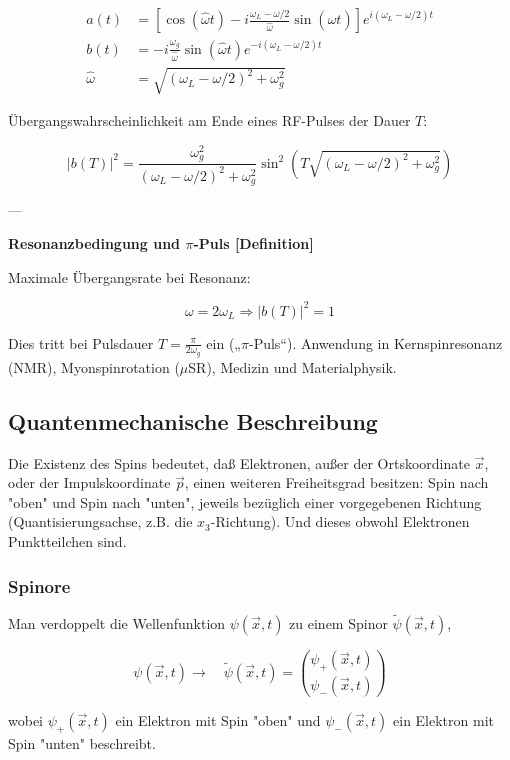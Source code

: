 \documentclass[10pt, letterpaper]{article}
\begin{document}
\[
\begin{aligned}
a(t) &= \left[\cos(\widehat{\omega} t) - i \frac{\omega_L - \omega/2}{\widehat{\omega}} \sin(\widehat{\omega} t) \right]
e^{i(\omega_L - \omega/2)t} \\
b(t) &= -i \frac{\omega_g}{\widehat{\omega}} \sin(\widehat{\omega} t)
e^{-i(\omega_L - \omega/2)t} \\
\widehat{\omega} &= \sqrt{(\omega_L - \omega/2)^2 + \omega_g^2}
\end{aligned}
\]

Übergangswahrscheinlichkeit am Ende eines RF-Pulses der Dauer \( T \):

\[
|b(T)|^2 =
\frac{\omega_g^2}{(\omega_L - \omega/2)^2 + \omega_g^2}
\sin^2\left(T \sqrt{(\omega_L - \omega/2)^2 + \omega_g^2} \right)
\]

---

\textbf{Resonanzbedingung und $\pi$-Puls [Definition]}

Maximale Übergangsrate bei Resonanz:

\[
\omega = 2 \omega_L \Rightarrow |b(T)|^2 = 1
\]

Dies tritt bei Pulsdauer \( T = \frac{\pi}{2 \omega_g} \) ein („$\pi$-Puls“). Anwendung in Kernspinresonanz (NMR), Myonspinrotation ($\mu$SR), Medizin und Materialphysik.




\pagebreak


\subsection*{Quantenmechanische Beschreibung}
Die Existenz des Spins bedeutet, daß Elektronen, außer der Ortskoordinate $\vec{x}$, oder der Impulskoordinate $\vec{p}$, einen weiteren Freiheitsgrad besitzen: Spin nach "oben" und Spin nach "unten", jeweils bezüglich einer vorgegebenen Richtung (Quantisierungsachse, z.B. die $x_{3}$-Richtung). Und dieses obwohl Elektronen Punktteilchen sind.

\subsubsection*{Spinore}
Man verdoppelt die Wellenfunktion $\psi(\vec{x}, t)$ zu einem Spinor $\tilde{\psi}(\vec{x}, t)$,

$$
\psi(\vec{x}, t) \rightarrow \quad \tilde{\psi}(\vec{x}, t)=\binom{\psi_{+}(\vec{x}, t)}{\psi_{-}(\vec{x}, t)}
$$

wobei $\psi_{+}(\vec{x}, t)$ ein Elektron mit Spin "oben" und $\psi_{-}(\vec{x}, t)$ ein Elektron mit Spin "unten" beschreibt.
\end{document}
